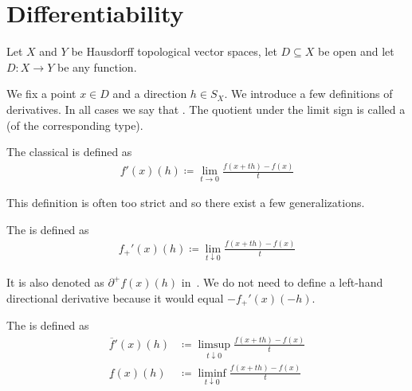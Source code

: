 \section{Differentiability}\label{sec:differentiability}

Let \( X \) and \( Y \) be Hausdorff topological vector spaces, let \( D \subseteq X \) be open and let \( D: X \to Y \) be any function.

\begin{definition}\label{def:derivatives}
  We fix a point \( x \in D \) and a direction \( h \in S_X \). We introduce a few definitions of derivatives. In all cases we say that . The quotient under the limit sign is called a  (of the corresponding type).

  \begin{defenum}
    \item\label{def:derivatives/classical} The classical  is defined as
    \begin{align*}
      f'(x)(h) \coloneqq \lim_{t \to 0} \frac {f(x + th) - f(x)} t
    \end{align*}

    This definition is often too strict and so there exist a few generalizations.

    \item\label{def:derivatives/onesided}\cite[lemma 1.2]{Phelps1993} The  is defined as
    \begin{align*}
      f_+'(x)(h) \coloneqq \lim_{t \downarrow 0} \frac {f(x + th) - f(x)} t
    \end{align*}

    It is also denoted as \( \partial^+ f(x)(h) \) in~\cite[lemma 1.2]{Phelps1993}. We do not need to define a left-hand directional derivative because it would equal \( -f_+'(x)(-h) \).

    \item\label{def:derivatives/dini}\cite[definition 11.18]{Clarke2013} The  is defined as
    \begin{align*}
      \overline f'(x)(h) &\coloneqq \limsup_{t \downarrow 0} \frac {f(x + th) - f(x)} t
      \\
      \underline f(x)(h) &\coloneqq \liminf_{t \downarrow 0} \frac {f(x + th) - f(x)} t
    \end{align*}


\end{defenum}
\end{definition}
